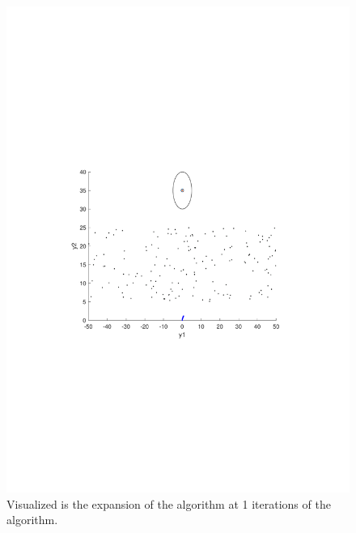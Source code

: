 \begin{figure}[!t]
  \centering
  \begin{minipage}[c]{.8\columnwidth}
  \includegraphics[width=1\columnwidth, trim={0cm, 10cm, 0cm, 9cm}, clip]{figures/experiments/rrtfunnel-1samples-dyn.pdf}
  \caption[The expansion of the \rrtfunnel algorithm at 1, and 101 iterations]{Visualized is the expansion of the \rrtfunnel algorithm at 1 iterations of the algorithm.}
  \end{minipage}
  \newline
  \begin{minipage}[c]{.8\columnwidth}

\end{minipage}
\end{figure}
